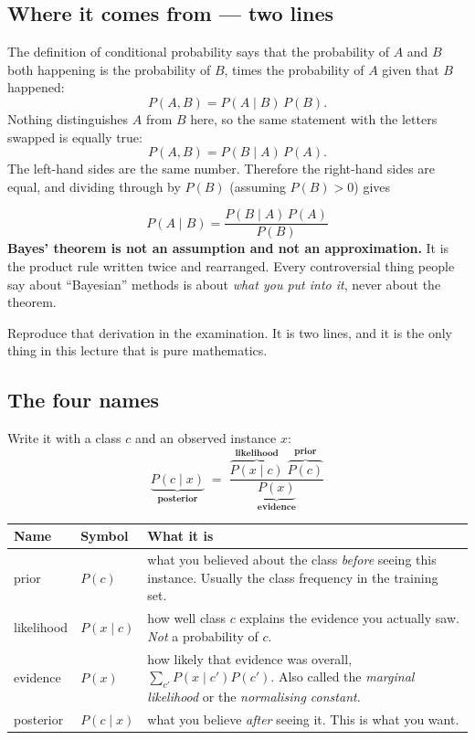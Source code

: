 \documentclass[11pt]{article}
\begin{document}
\subsection{Where it comes from --- two lines}
\label{sec:derive}

The definition of conditional probability says that the probability of $A$
and $B$ both happening is the probability of $B$, times the probability of
$A$ given that $B$ happened:
\[
  P(A, B) = P(A \mid B)\,P(B).
\]
Nothing distinguishes $A$ from $B$ here, so the same statement with the
letters swapped is equally true:
\[
  P(A, B) = P(B \mid A)\,P(A).
\]
The left-hand sides are the same number. Therefore the right-hand sides are
equal, and dividing through by $P(B)$ (assuming $P(B) > 0$) gives

\begin{keyidea}
\[
  P(A \mid B) = \frac{P(B \mid A)\,P(A)}{P(B)}
\]
\textbf{Bayes' theorem is not an assumption and not an approximation.} It is
the product rule written twice and rearranged. Every controversial thing
people say about ``Bayesian'' methods is about \emph{what you put into it},
never about the theorem.
\end{keyidea}

Reproduce that derivation in the examination. It is two lines, and it is the
only thing in this lecture that is pure mathematics.

\subsection{The four names}

Write it with a class $c$ and an observed instance $x$:
\[
  \underbrace{P(c \mid x)}_{\textbf{posterior}} \;=\;
  \frac{\overbrace{P(x \mid c)}^{\textbf{likelihood}}\;
        \overbrace{P(c)}^{\textbf{prior}}}
       {\underbrace{P(x)}_{\textbf{evidence}}}
\]

\begin{center}\small
\begin{tabular}{@{}llp{7.4cm}@{}}
\toprule
\textbf{Name} & \textbf{Symbol} & \textbf{What it is}\\
\midrule
prior & $P(c)$ & what you believed about the class \emph{before} seeing this
  instance. Usually the class frequency in the training set.\\
likelihood & $P(x \mid c)$ & how well class $c$ explains the evidence you
  actually saw. \emph{Not} a probability of $c$.\\
evidence & $P(x)$ & how likely that evidence was overall,
  $\sum_{c'} P(x \mid c')P(c')$. Also called the \emph{marginal likelihood}
  or the \emph{normalising constant}.\\
posterior & $P(c \mid x)$ & what you believe \emph{after} seeing it. This is
  what you want.\\
\bottomrule
\end{tabular}
\end{center}
\end{document}
